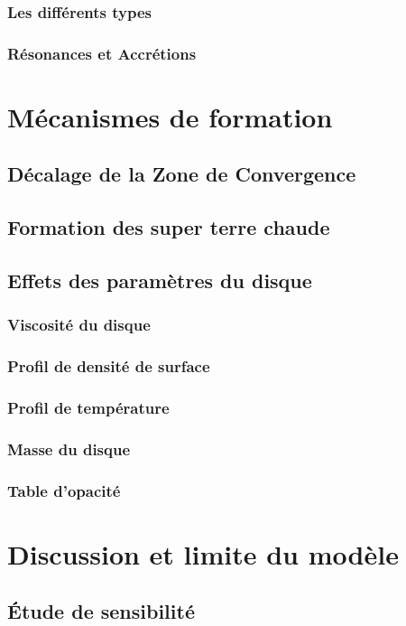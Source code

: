 \documentclass[a4paper,twoside]{book}
\begin{document}
\subsection{Les différents types}
\subsection{Résonances et Accrétions}

\chapter{Mécanismes de formation}
\section{Décalage de la Zone de Convergence}
\section{Formation des super terre chaude}
\section{Effets des paramètres du disque}
\subsection{Viscosité du disque}
\subsection{Profil de densité de surface}
\subsection{Profil de température}
\subsection{Masse du disque}
\subsection{Table d'opacité}

\chapter{Discussion et limite du modèle}
\section{Étude de sensibilité}
\end{document}
